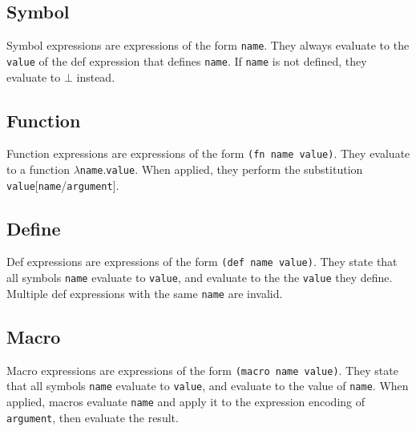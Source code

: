 \documentclass{article}
\newcommand{\comm}[1]{}
\begin{document}
    \begin{multicols}{\comm{2}}
        \subsection{Symbol}\label{subsec:symbol}

        \begin{minipage}{\columnwidth}
            Symbol expressions are expressions of the form \texttt{name}.
            They always evaluate to the \texttt{value} of the def expression that defines \texttt{name}.
            If \texttt{name} is not defined, they evaluate to $\bot$ instead.
        \end{minipage}

        \subsection{Function}\label{subsec:function}

        \begin{minipage}{\columnwidth}
            Function expressions are expressions of the form \lstinline{(fn name value)}.
            They evaluate to a function $\lambda$\texttt{name}.\texttt{value}.
            When applied, they perform the substitution \texttt{value}[\texttt{name}/\texttt{argument}].
        \end{minipage}

        \subsection{Define}\label{subsec:def}

        \begin{minipage}{\columnwidth}
            Def expressions are expressions of the form \lstinline{(def name value)}.
            They state that all symbols \texttt{name} evaluate to \texttt{value}, and evaluate to the the \texttt{value} they define.
            Multiple def expressions with the same \texttt{name} are invalid.
        \end{minipage}

        \subsection{Macro}\label{subsec:macro}

        \begin{minipage}{\columnwidth}
            Macro expressions are expressions of the form \lstinline{(macro name value)}.
            They state that all symbols \texttt{name} evaluate to \texttt{value}, and evaluate to the value of \texttt{name}.
            When applied, macros evaluate \texttt{name} and apply it to the expression encoding of \texttt{argument}, then evaluate the result.
        \end{minipage}


\end{multicols}
\end{document}
